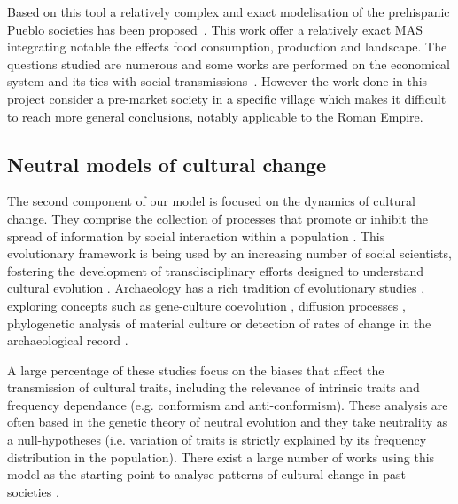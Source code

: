 \documentclass{wscpaperproc}
\begin{document}
Based on this tool a relatively complex and exact modelisation of the prehispanic Pueblo societies has been proposed~\cite{kohler_modelling_2012}. This work offer a relatively exact MAS integrating notable the effects food consumption, production and landscape. The questions studied are  numerous and some works are performed on the economical system and its ties with social transmissions~\cite{kobti_emergence_2006,cockburn_simulating_2013}. However the work done in this project consider a pre-market society in a specific village which makes it difficult to reach more general conclusions, notably applicable to the Roman Empire.




\subsection{Neutral models of cultural change}

The second component of our model is focused on the dynamics of cultural change. They comprise the collection of processes that promote or inhibit the spread of information by social interaction within a population \cite[3]{boyd_origin_2005}. This evolutionary framework is being used by an increasing number of social scientists, fostering the development of transdisciplinary efforts designed to understand cultural evolution \cite{henrich_evolution_2003}. Archaeology has a rich tradition of evolutionary studies \cite{lycett_cultural_2015}, exploring concepts such as gene-culture coevolution \cite{burger_absence_2007}, diffusion processes \cite{fort_synthesis_2012}, phylogenetic analysis of material culture \cite{obrien_cladistics_2001} or detection of rates of change in the archaeological record \cite{premo_cultural_2014}.

A large percentage of these studies focus on the biases that affect the transmission of cultural traits, including the relevance of intrinsic traits and frequency dependance (e.g. conformism and anti-conformism). These analysis are often based in the genetic theory of neutral evolution \cite{neiman_stylistic_1995} and they take neutrality as a null-hypotheses (i.e. variation of traits is strictly explained by its frequency distribution in the population). There exist a large number of works using this model as the starting point to analyse patterns of cultural change in past societies \cite{lipo_neutralitystyle_2001,shennan_ceramic_2001,steele_ceramic_2010,kandler_nonequilibrium_2013,porcic_exploring_2014,crema_approximate_2014}.
\end{document}
